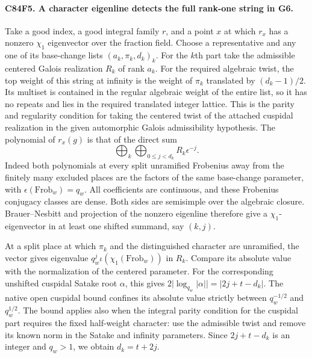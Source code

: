 \paragraph{C84F5. A character eigenline detects the full rank-one string in G6.}
Take a good index, a good integral family $r$, and a point $x$ at
which $r_x$ has a nonzero $\chi_1$ eigenvector over the fraction
field. Choose a representative and any one of its base-change
lists $(a_k,\pi_k,d_k)_k$. For the $k$th part take the admissible
centered Galois realization $R_k$ of rank $a_k$. For the required
algebraic twist, the top weight of this string at infinity is the
weight of $\pi_k$ translated by $(d_k-1)/2$. Its multiset is
contained in the regular algebraic weight of the entire list, so
it has no repeats and lies in the required translated integer
lattice. This is the parity and regularity condition for taking
the centered twist of the attached cuspidal realization in the
given automorphic Galois admissibility hypothesis. The polynomial
of $r_x(g)$ is that of the direct sum
\[
               \bigoplus_k\bigoplus_{0\le j<d_k}
                                     R_k\epsilon^{-j}.
\]
Indeed both polynomials at every split unramified Frobenius away
from the finitely many excluded places are the factors of the
same base-change parameter, with $\epsilon(\mathrm{Frob}_w)=q_w$.
All coefficients are continuous, and these Frobenius conjugacy
classes are dense. Both sides are semisimple over the algebraic
closure. Brauer--Nesbitt and projection of the nonzero eigenline
therefore give a $\chi_1$-eigenvector in at least one shifted
summand, say $(k,j)$.

At a split place at which $\pi_k$ and the distinguished character
are unramified, the vector gives eigenvalue
$q_w^{j}\iota(\chi_1(\mathrm{Frob}_w))$ in $R_k$. Compare its
absolute value with the normalization of the centered parameter.
For the corresponding unshifted cuspidal Satake root $\alpha$,
this gives $2\bigl|\log_{q_w}\lvert\alpha\rvert\bigr|=|2j+t-d_k|$. The native open cuspidal bound confines its absolute
value strictly between $q_w^{-1/2}$ and $q_w^{1/2}$.
The bound applies also when the integral parity condition for the
cuspidal part requires the fixed half-weight character: use the
admissible twist and remove its known norm in the Satake and
infinity parameters. Since $2j+t-d_k$ is an integer and $q_w>1$,
we obtain $d_k=t+2j$.


